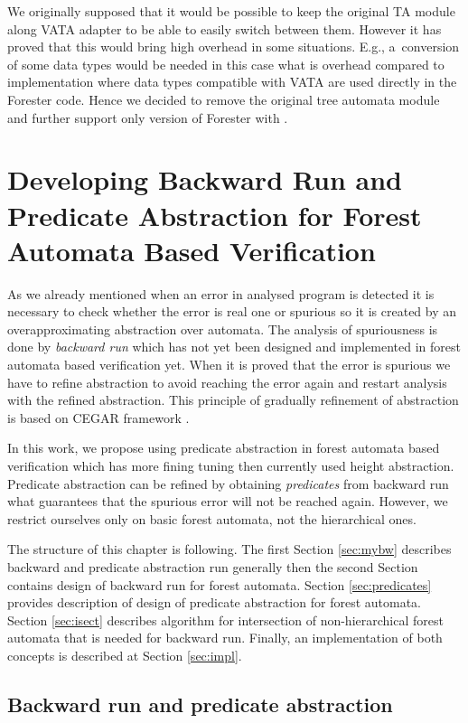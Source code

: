 We originally supposed that it would be possible to keep the original TA module along VATA adapter
to be able to easily switch between them.
However it has proved that this would bring high overhead in some situations.
E.g., a~conversion of some data types would be needed in this case
what is overhead compared to implementation where data types compatible with VATA are used directly in the Forester code.
Hence we decided to remove the original tree automata module and further support only version of Forester with \vata.

\chapter{Developing Backward Run and Predicate Abstraction for Forest Automata Based Verification}
\label{ch:backward}

As we already mentioned when an error in analysed program is detected
it is necessary to check whether the error is real one or spurious
so it is created by an overapproximating abstraction over automata.
The analysis of spuriousness is done by \emph{backward run} which has not
yet been designed and implemented in forest automata based verification yet.
When it is proved that the error is spurious we have to refine abstraction to avoid
reaching the error again and restart analysis with the refined abstraction.
This principle of gradually refinement of abstraction is based on CEGAR framework \cite{cegar}.

In this work, we propose using predicate abstraction \cite{artmc} in forest automata based verification
which has more fining tuning then currently used height abstraction.
Predicate abstraction can be refined by obtaining \emph{predicates} from backward run
what guarantees that the spurious error will not be reached again.
However, we restrict ourselves only on basic forest automata, not the hierarchical ones.

The structure of this chapter is following.
The first Section \ref{sec:mybw} describes backward and predicate abstraction run generally
then the second Section contains design of backward run for forest automata.
Section \ref{sec:predicates} provides description of design of
predicate abstraction for forest automata.
Section \ref{sec:isect} describes algorithm for intersection of non-hierarchical forest automata
that is needed for backward run.
Finally, an implementation of both concepts is described at Section \ref{sec:impl}.

\section{Backward run and predicate abstraction}

